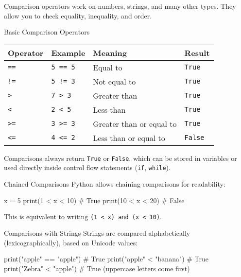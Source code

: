 \documentclass[
  letterpaper,
  DIV=11,
  numbers=noendperiod]{scrreprt}
\newenvironment{Shaded}{\begin{snugshade}}{\end{snugshade}}
\newcommand{\BuiltInTok}[1]{\textcolor[rgb]{0.00,0.23,0.31}{#1}}
\newcommand{\CommentTok}[1]{\textcolor[rgb]{0.37,0.37,0.37}{#1}}
\newcommand{\DecValTok}[1]{\textcolor[rgb]{0.68,0.00,0.00}{#1}}
\newcommand{\NormalTok}[1]{\textcolor[rgb]{0.00,0.23,0.31}{#1}}
\newcommand{\OperatorTok}[1]{\textcolor[rgb]{0.37,0.37,0.37}{#1}}
\newcommand{\StringTok}[1]{\textcolor[rgb]{0.13,0.47,0.30}{#1}}
\begin{document}
Comparison operators work on numbers, strings, and many other types.
They allow you to check equality, inequality, and order.

Basic Comparison Operators

\begin{longtable}[]{@{}llll@{}}
\toprule\noalign{}
Operator & Example & Meaning & Result \\
\midrule\noalign{}
\endhead
\bottomrule\noalign{}
\endlastfoot
\texttt{==} & \texttt{5\ ==\ 5} & Equal to & \texttt{True} \\
\texttt{!=} & \texttt{5\ !=\ 3} & Not equal to & \texttt{True} \\
\texttt{\textgreater{}} & \texttt{7\ \textgreater{}\ 3} & Greater than &
\texttt{True} \\
\texttt{\textless{}} & \texttt{2\ \textless{}\ 5} & Less than &
\texttt{True} \\
\texttt{\textgreater{}=} & \texttt{3\ \textgreater{}=\ 3} & Greater than
or equal to & \texttt{True} \\
\texttt{\textless{}=} & \texttt{4\ \textless{}=\ 2} & Less than or equal
to & \texttt{False} \\
\end{longtable}

Comparisons always return \texttt{True} or \texttt{False}, which can be
stored in variables or used directly inside control flow statements
(\texttt{if}, \texttt{while}).

Chained Comparisons Python allows chaining comparisons for readability:

\begin{Shaded}
\begin{Highlighting}[]
\NormalTok{x }\OperatorTok{=} \DecValTok{5}
\BuiltInTok{print}\NormalTok{(}\DecValTok{1} \OperatorTok{\textless{}}\NormalTok{ x }\OperatorTok{\textless{}} \DecValTok{10}\NormalTok{)  }\CommentTok{\# True}
\BuiltInTok{print}\NormalTok{(}\DecValTok{10} \OperatorTok{\textless{}}\NormalTok{ x }\OperatorTok{\textless{}} \DecValTok{20}\NormalTok{) }\CommentTok{\# False}
\end{Highlighting}
\end{Shaded}

This is equivalent to writing
\texttt{(1\ \textless{}\ x)\ and\ (x\ \textless{}\ 10)}.

Comparisons with Strings Strings are compared alphabetically
(lexicographically), based on Unicode values:

\begin{Shaded}
\begin{Highlighting}[]
\BuiltInTok{print}\NormalTok{(}\StringTok{"apple"} \OperatorTok{==} \StringTok{"apple"}\NormalTok{)  }\CommentTok{\# True}
\BuiltInTok{print}\NormalTok{(}\StringTok{"apple"} \OperatorTok{\textless{}} \StringTok{"banana"}\NormalTok{)  }\CommentTok{\# True}
\BuiltInTok{print}\NormalTok{(}\StringTok{"Zebra"} \OperatorTok{\textless{}} \StringTok{"apple"}\NormalTok{)   }\CommentTok{\# True (uppercase letters come first)}
\end{Highlighting}
\end{Shaded}
\end{document}
